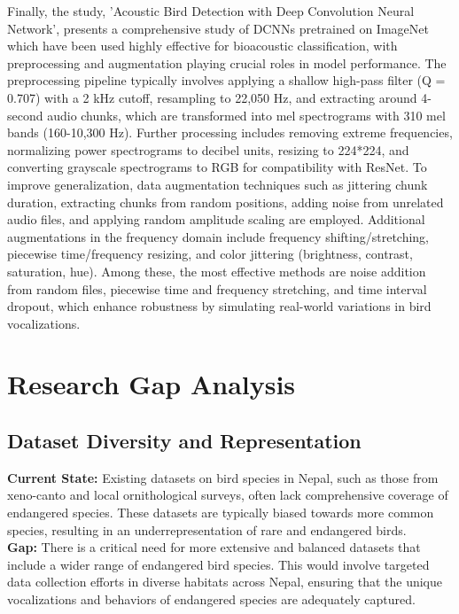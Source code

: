 Finally, the study\cite{lasseck2018acoustic}, 'Acoustic Bird Detection with
Deep Convolution Neural Network', presents a comprehensive study of DCNNs pretrained on ImageNet which have been used highly effective
for bioacoustic classification, with preprocessing and augmentation playing
crucial roles in model performance. The preprocessing pipeline typically
involves applying a shallow high-pass filter (Q = 0.707) with a 2 kHz cutoff,
resampling to 22,050 Hz, and extracting around 4-second audio chunks, which are
transformed into mel spectrograms with 310 mel bands (160-10,300 Hz). Further
processing includes removing extreme frequencies, normalizing power
spectrograms to decibel units, resizing to 224*224, and converting grayscale
spectrograms to RGB for compatibility with ResNet. To improve generalization,
data augmentation techniques such as jittering chunk duration, extracting
chunks from random positions, adding noise from unrelated audio files, and
applying random amplitude scaling are employed. Additional augmentations in the
frequency domain include frequency shifting/stretching, piecewise
time/frequency resizing, and color jittering (brightness, contrast, saturation,
hue). Among these, the most effective methods are noise addition from random
files, piecewise time and frequency stretching, and time interval dropout,
which enhance robustness by simulating real-world variations in bird
vocalizations.\\


\section{Research Gap Analysis}

\subsection{Dataset Diversity and Representation}
\textbf{Current State:} Existing datasets on bird species in Nepal, such as those from xeno-canto and local ornithological surveys, often lack comprehensive coverage of endangered species. These datasets are typically biased towards more common species, resulting in an underrepresentation of rare and endangered birds.\\
\textbf{Gap:} There is a critical need for more extensive and balanced datasets that include a wider range of endangered bird species. This would involve targeted data collection efforts in diverse habitats across Nepal, ensuring that the unique vocalizations and behaviors of endangered species are adequately captured.

